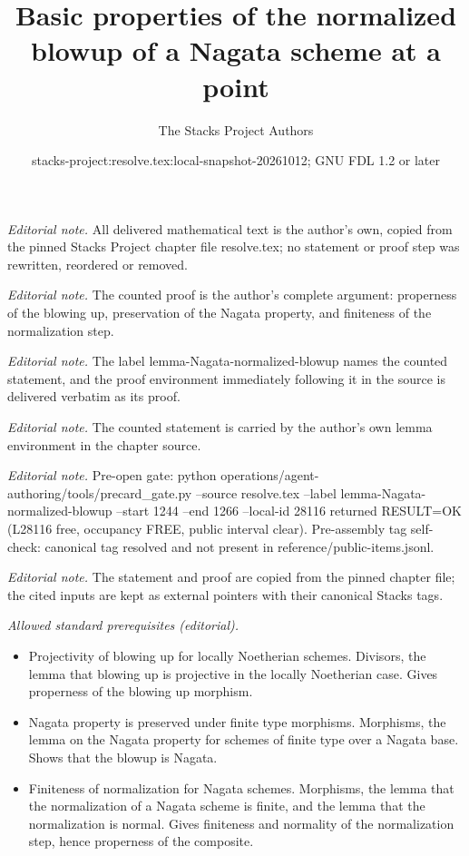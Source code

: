 \documentclass[10pt,a4paper]{amsart}
\title{Basic properties of the normalized blowup of a Nagata scheme at a point}
\author{The Stacks Project Authors}
\date{stacks-project:resolve.tex:local-snapshot-20261012; GNU FDL 1.2 or later}
\theoremstyle{plain}
\theoremstyle{definition}
\theoremstyle{remark}
\numberwithin{equation}{subsection}
\begin{document}
\maketitle
\noindent\textit{Editorial note.} All delivered mathematical text is the author's own, copied from the pinned Stacks Project chapter file resolve.tex; no statement or proof step was rewritten, reordered or removed.\par\medskip
\noindent\textit{Editorial note.} The counted proof is the author's complete argument: properness of the blowing up, preservation of the Nagata property, and finiteness of the normalization step.\par\medskip
\noindent\textit{Editorial note.} The label lemma-Nagata-normalized-blowup names the counted statement, and the proof environment immediately following it in the source is delivered verbatim as its proof.\par\medskip
\noindent\textit{Editorial note.} The counted statement is carried by the author's own lemma environment in the chapter source.\par\medskip
\noindent\textit{Editorial note.} Pre-open gate: python operations/agent-authoring/tools/precard\_gate.py --source resolve.tex --label lemma-Nagata-normalized-blowup --start 1244 --end 1266 --local-id 28116 returned RESULT=OK (L28116 free, occupancy FREE, public interval clear). Pre-assembly tag self-check: canonical tag resolved and not present in reference/public-items.jsonl.\par\medskip
\noindent\textit{Editorial note.} The statement and proof are copied from the pinned chapter file; the cited inputs are kept as external pointers with their canonical Stacks tags.\par\medskip
\noindent\textit{Allowed standard prerequisites (editorial).}\begin{itemize}
\item Projectivity of blowing up for locally Noetherian schemes. Divisors, the lemma that blowing up is projective in the locally Noetherian case. Gives properness of the blowing up morphism.
\item Nagata property is preserved under finite type morphisms. Morphisms, the lemma on the Nagata property for schemes of finite type over a Nagata base. Shows that the blowup is Nagata.
\item Finiteness of normalization for Nagata schemes. Morphisms, the lemma that the normalization of a Nagata scheme is finite, and the lemma that the normalization is normal. Gives finiteness and normality of the normalization step, hence properness of the composite.
\end{itemize}\medskip
\end{document}
